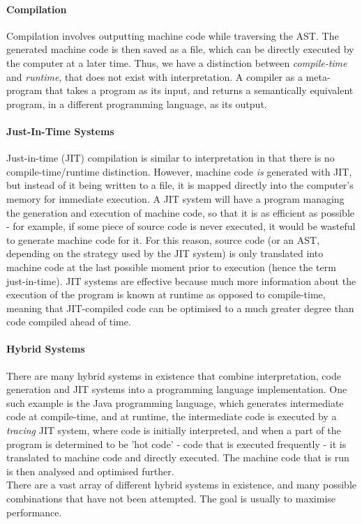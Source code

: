 \documentclass{article}
\begin{document}
\paragraph{Compilation \\}
Compilation involves outputting machine code while traversing the AST. The generated machine code is then saved as a file, which can be directly executed by the computer at a later time. Thus, we have a distinction between \emph{compile-time} and \emph{runtime}, that does not exist with interpretation. A compiler as a meta-program that takes a program as its input, and returns a semantically equivalent program, in a different programming language, as its output.

\paragraph{Just-In-Time Systems \\}
Just-in-time (JIT) compilation is similar to interpretation in that there is no compile-time/runtime distinction. However, machine code \emph{is} generated with JIT, but instead of it being written to a file, it is mapped directly into the computer's memory for immediate execution. A JIT system will have a program managing the generation and execution of machine code, so that it is as efficient as possible - for example, if some piece of source code is never executed, it would be wasteful to generate machine code for it. For this reason, source code (or an AST, depending on the strategy used by the JIT system) is only translated into machine code at the last possible moment prior to execution (hence the term just-in-time). JIT systems are effective because much more information about the execution of the program is known at runtime as opposed to compile-time, meaning that JIT-compiled code can be optimised to a much greater degree than code compiled ahead of time.

\paragraph{Hybrid Systems \\}
There are many hybrid systems in existence that combine interpretation, code generation and JIT systems into a programming language implementation. One such example is the Java programming language, which generates intermediate code at compile-time, and at runtime, the intermediate code is executed by a \emph{tracing} JIT system, where code is initially interpreted, and when a part of the program is determined to be 'hot code' - code that is executed frequently - it is translated to machine code and directly executed. The machine code that is run is then analysed and optimised further.
\\\indent There are a vast array of different hybrid systems in existence, and many possible combinations that have not been attempted. The goal is usually to maximise performance.
\end{document}
